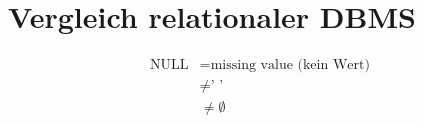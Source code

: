 \section{Vergleich relationaler DBMS}
\begin{align*}
\text{NULL} &= \text{missing value (kein Wert)}\\
&\not = \text{' '}\\
&\not = \emptyset
\end{align*}



